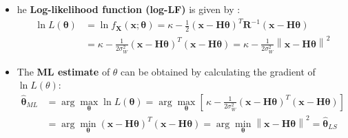 \begin{itemize}
\item he \textbf{Log-likelihood function (log-LF)} is given by :
\begin{align*}
\ln L(\boldsymbol{\theta})
&= \ln f_{\mathbf{X}}(\mathbf{x}; \boldsymbol{\theta})
  = \kappa - \frac{1}{2}
    (\mathbf{x} - \mathbf{H}\boldsymbol{\theta})^{T}
    \mathbf{R}^{-1}
    (\mathbf{x} - \mathbf{H}\boldsymbol{\theta}) \\[4pt]
&= \kappa - \frac{1}{2\sigma_W^{2}}
    (\mathbf{x} - \mathbf{H}\boldsymbol{\theta})^{T}
    (\mathbf{x} - \mathbf{H}\boldsymbol{\theta}) 
= \kappa - \frac{1}{2\sigma_W^{2}}
    \left\| \mathbf{x} - \mathbf{H}\boldsymbol{\theta} \right\|^{2}
\end{align*}
\item The \textbf{ML estimate} of \(\theta\) can be obtained by calculating the gradient of \(\ln L (\theta)\):
\begin{align*}
\hat{\boldsymbol{\theta}}_{ML}
&= \arg\max_{\boldsymbol{\theta}} \ln L(\boldsymbol{\theta})
 = \arg\max_{\boldsymbol{\theta}}
   \left[\, \kappa - \frac{1}{2\sigma_W^{2}}
   (\mathbf{x} - \mathbf{H}\boldsymbol{\theta})^{T}
   (\mathbf{x} - \mathbf{H}\boldsymbol{\theta}) \right] \\[4pt]
&= \arg\min_{\boldsymbol{\theta}}
   (\mathbf{x} - \mathbf{H}\boldsymbol{\theta})^{T}
   (\mathbf{x} - \mathbf{H}\boldsymbol{\theta})
 = \arg\min_{\boldsymbol{\theta}}
   \left\| \mathbf{x} - \mathbf{H}\boldsymbol{\theta} \right\|^{2}
 = \hat{\boldsymbol{\theta}}_{LS}
\end{align*}


\end{itemize}
